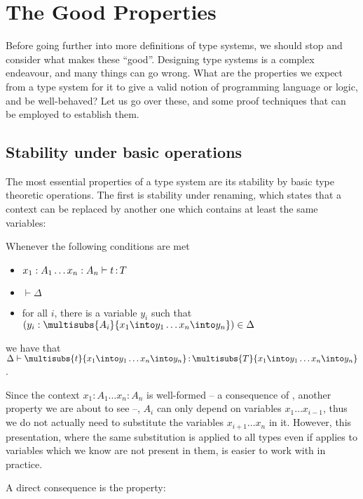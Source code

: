 \section{The Good Properties}
\label{sec:tech-properties}

Before going further into more definitions of type systems, we should stop and consider
what makes these “good”. Designing type systems is a complex endeavour,
and many things can go wrong. What are the properties we expect from a type
system for it to give a valid notion of programming language or logic, and be well-behaved?
Let us go over these, and some proof techniques that can be employed to establish them.

\subsection{Stability under basic operations}

The most essential properties of a type system are its stability
by basic type theoretic operations.
The first is stability under renaming, which states that a context can be replaced by another
one which contains at least the same variables:

\begin{property}
  \label{prop:stab-renaming}
  Whenever the following conditions are met
  \begin{itemize}
    \item $x_1 : A_1 \dots x_n : A_n \vdash t \operatorname{\mathrel{:}} T$
    \item $\vdash \Delta$
    \item for all $i$, there is a variable $y_i$ such that $(y_i : \multisubs{A_i}{x_1 \into y_1 \dots x_n \into y_n}) \in \Delta$%
  \end{itemize} 
  we have that $\Delta \vdash \multisubs{t}{x_1 \into y_1 \dots x_n \into y_n} \ty \multisubs{T}{x_1 \into y_1 \dots x_n \into y_n}$.
\end{property}

Since the context $x_1 : A_1 \dots x_n : A_n$ is well-formed – a consequence of
, another property we are about to see –, $A_i$ can only depend on variables
$x_1 \dots x_{i-1}$, thus we do not actually need to substitute the variables
$x_{i+1} \dots x_n$ in it. However, this presentation, where the same substitution is applied
to all types even if applies to variables which we know are not present in them,
is easier to work with in practice.

A direct consequence is the  property:

